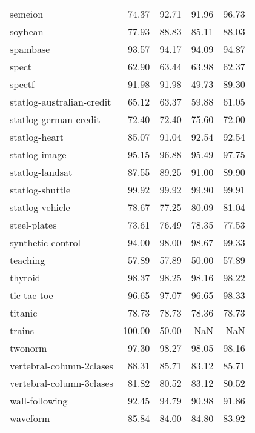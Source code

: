 \begin{longtable}{lrrrr}
                       semeion &   74.37 &    92.71 &  91.96 &  96.73 \\
                       soybean &   77.93 &    88.83 &  85.11 &  88.03 \\
                      spambase &   93.57 &    94.17 &  94.09 &  94.87 \\
                         spect &   62.90 &    63.44 &  63.98 &  62.37 \\
                        spectf &   91.98 &    91.98 &  49.73 &  89.30 \\
     statlog-australian-credit &   65.12 &    63.37 &  59.88 &  61.05 \\
         statlog-german-credit &   72.40 &    72.40 &  75.60 &  72.00 \\
                 statlog-heart &   85.07 &    91.04 &  92.54 &  92.54 \\
                 statlog-image &   95.15 &    96.88 &  95.49 &  97.75 \\
               statlog-landsat &   87.55 &    89.25 &  91.00 &  89.90 \\
               statlog-shuttle &   99.92 &    99.92 &  99.90 &  99.91 \\
               statlog-vehicle &   78.67 &    77.25 &  80.09 &  81.04 \\
                  steel-plates &   73.61 &    76.49 &  78.35 &  77.53 \\
             synthetic-control &   94.00 &    98.00 &  98.67 &  99.33 \\
                      teaching &   57.89 &    57.89 &  50.00 &  57.89 \\
                       thyroid &   98.37 &    98.25 &  98.16 &  98.22 \\
                   tic-tac-toe &   96.65 &    97.07 &  96.65 &  98.33 \\
                       titanic &   78.73 &    78.73 &  78.36 &  78.73 \\
                        trains &  100.00 &    50.00 &    NaN &    NaN \\
                       twonorm &   97.30 &    98.27 &  98.05 &  98.16 \\
      vertebral-column-2clases &   88.31 &    85.71 &  83.12 &  85.71 \\
      vertebral-column-3clases &   81.82 &    80.52 &  83.12 &  80.52 \\
                wall-following &   92.45 &    94.79 &  90.98 &  91.86 \\
                      waveform &   85.84 &    84.00 &  84.80 &  83.92 \\

\end{longtable}
